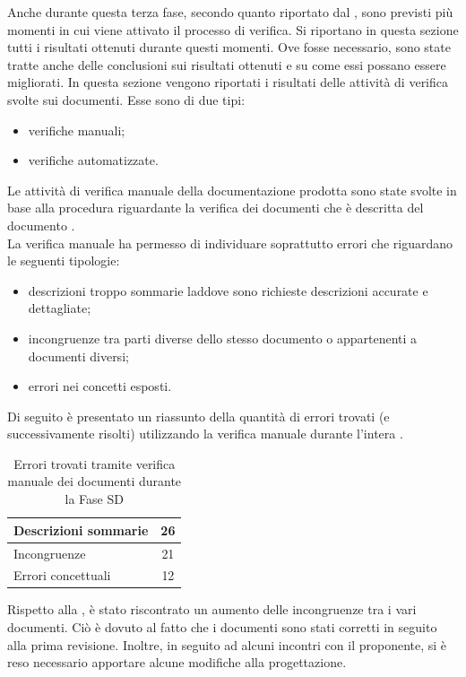 \label{app:esitiSD}
Anche durante questa terza fase, secondo quanto riportato dal , sono previsti più momenti in cui viene attivato il processo di verifica. Si riportano in questa sezione tutti i risultati ottenuti durante questi momenti. Ove fosse necessario, sono state tratte anche delle conclusioni sui risultati ottenuti e su come essi possano essere migliorati.
			In questa sezione vengono riportati i risultati delle attività di verifica svolte sui documenti. Esse sono di due tipi:
			\begin{itemize}
				\item verifiche manuali;
				\item verifiche automatizzate.
			\end{itemize}
				Le attività di verifica manuale della documentazione prodotta sono state svolte in base alla procedura riguardante la verifica dei 
				documenti che è descritta del documento .\\
				La verifica manuale ha permesso di individuare soprattutto errori che riguardano le seguenti tipologie:
				\begin{itemize}
					\item descrizioni troppo sommarie laddove sono richieste descrizioni accurate e dettagliate;
					\item incongruenze tra parti diverse dello stesso documento o appartenenti a documenti diversi;
					\item errori nei concetti esposti.
				\end{itemize}
				Di seguito è presentato un riassunto della quantità di errori trovati (e successivamente risolti) utilizzando la verifica manuale durante l'intera .
				\begin{table}[H]
					\centering
					\begin{tabu}{| l | c |}
						\hline
						Descrizioni sommarie	&	26\\ \hline
						Incongruenze	&	21\\ \hline
						Errori concettuali	&	12\\ \hline
					\end{tabu}
					\caption{Errori trovati tramite verifica manuale dei documenti durante la Fase SD}
				\end{table}
				Rispetto alla , è stato riscontrato un aumento delle incongruenze tra i vari documenti. Ciò è dovuto al fatto che i documenti sono stati corretti in seguito alla prima revisione. Inoltre, in seguito ad alcuni incontri con il proponente, si è reso necessario apportare alcune modifiche alla progettazione.\\
